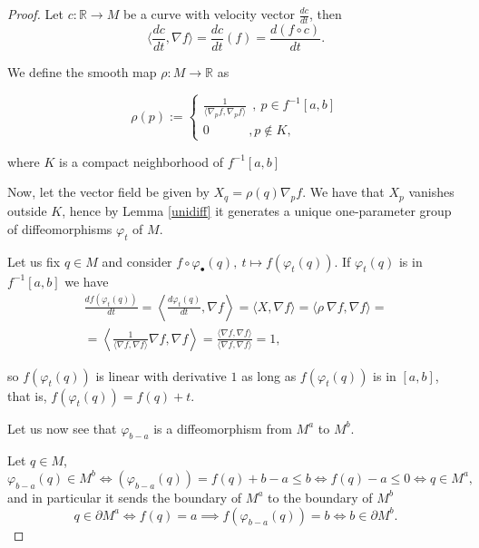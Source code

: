 \begin{proof}
    Let $c:\mathbb{R}\to M$ be a curve with velocity vector $\frac{dc}{dt}$, then
    \begin{equation*}
        \langle \frac{dc}{dt}, \nabla f\rangle = \frac{dc}{dt}(f)=\frac{d(f\circ c)}{dt}.
    \end{equation*}

    We define the smooth map $\rho : M\to \mathbb{R}$ as

    \begin{equation*}
        \rho(p):=
        \begin{cases}
            \frac{1}{\langle \nabla_pf, \nabla_pf\rangle}~~,~p\in f^{-1}[a,b]\\
            0 ~~~~~~~~~~~~~~,p\notin K,
        \end{cases}
    \end{equation*}

    where $K$ is a compact neighborhood of $f^{-1}[a,b]$ %

    Now, let the vector field be given by $X_q=\rho(q)\nabla_pf$. We have that $X_p$ vanishes outside $K$, hence by Lemma \ref{unidiff} it generates a unique one-parameter group of diffeomorphisms $\varphi_t$ of $M$.

    Let us fix $q\in M$ and consider $f\circ\varphi_{\bullet}(q),~t\mapsto f(\varphi_t(q))$. If $\varphi_t(q)$ is in $f^{-1}[a,b]$ we have
    \begin{align*}
        \frac{df(\varphi_t(q))}{dt} = \left\langle \frac{d\varphi_t(q)}{dt},\nabla f\right\rangle = \langle X, \nabla f\rangle = \langle \rho~ \nabla f, \nabla f\rangle =\\ =\left\langle \frac{1}{\langle \nabla f,\nabla f\rangle}\nabla f,\nabla f\right\rangle=
        \frac{\langle \nabla f,\nabla f\rangle}{\langle \nabla f,\nabla f\rangle}= 1,
    \end{align*}

    so $f(\varphi_t(q))$ is linear with derivative $1$ as long as $f(\varphi_t(q))$ is in $[a,b]$, that is, $f(\varphi_t(q))=f(q)+t$.

    Let us now see that $\varphi_{b-a}$ is a diffeomorphism from $M^a$ to $M^b$.

    Let $q\in M$,
    \begin{equation*}
        \varphi_{b-a}(q)\in M^b \iff(\varphi_{b-a}(q))=f(q)+b-a\le b \iff f(q)-a\le 0 \iff q\in M^a, %
    \end{equation*}
     and in particular it sends the boundary of $M^a$ to the boundary of $M^b$
     \begin{equation*}
         q\in \partial M^a \iff f(q)=a \implies f(\varphi_{b-a}(q))=b \iff b\in \partial M^b. %
     \end{equation*}


\end{proof}

